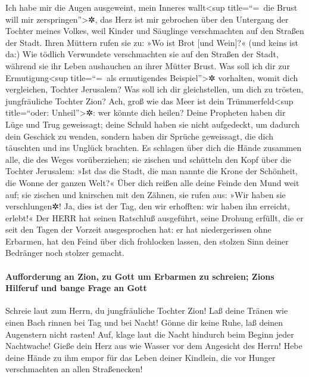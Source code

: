 Ich habe mir die Augen ausgeweint, mein Inneres
wallt\textless sup title=``=~die Brust will mir
zerspringen''\textgreater✲, das Herz ist mir gebrochen über den
Untergang der Tochter meines Volkes, weil Kinder und Säuglinge
verschmachten auf den Straßen der Stadt. Ihren Müttern
rufen sie zu: »Wo ist Brot {[}und Wein{]}?« (und keins ist da:) Wie
tödlich Verwundete verschmachten sie auf den Straßen der Stadt, während
sie ihr Leben aushauchen an ihrer Mütter Brust. Was soll
ich dir zur Ermutigung\textless sup title=``=~als ermutigendes
Beispiel''\textgreater✲ vorhalten, womit dich vergleichen, Tochter
Jerusalem? Was soll ich dir gleichstellen, um dich zu trösten,
jungfräuliche Tochter Zion? Ach, groß wie das Meer ist dein
Trümmerfeld\textless sup title=``oder: Unheil''\textgreater✲: wer könnte
dich heilen? Deine Propheten haben dir Lüge und Trug
geweissagt; deine Schuld haben sie nicht aufgedeckt, um dadurch dein
Geschick zu wenden, sondern haben dir Sprüche geweissagt, die dich
täuschten und ins Unglück brachten. Es schlagen über dich
die Hände zusammen alle, die des Weges vorüberziehen; sie zischen und
schütteln den Kopf über die Tochter Jerusalem: »Ist das die Stadt, die
man nannte die Krone der Schönheit, die Wonne der ganzen Welt?«
Über dich reißen alle deine Feinde den Mund weit auf; sie
zischen und knirschen mit den Zähnen, sie rufen aus: »Wir haben sie
verschlungen✲! Ja, dies ist der Tag, den wir erhofften: wir haben ihn
erreicht, erlebt!« Der HERR hat seinen Ratschluß
ausgeführt, seine Drohung erfüllt, die er seit den Tagen der Vorzeit
ausgesprochen hat: er hat niedergerissen ohne Erbarmen, hat den Feind
über dich frohlocken lassen, den stolzen Sinn deiner Bedränger noch
stolzer gemacht.

\hypertarget{aufforderung-an-zion-zu-gott-um-erbarmen-zu-schreien-zions-hilferuf-und-bange-frage-an-gott}{%
\paragraph{Aufforderung an Zion, zu Gott um Erbarmen zu schreien; Zions
Hilferuf und bange Frage an
Gott}\label{aufforderung-an-zion-zu-gott-um-erbarmen-zu-schreien-zions-hilferuf-und-bange-frage-an-gott}}

Schreie laut zum Herrn, du jungfräuliche Tochter Zion!
Laß deine Tränen wie einen Bach rinnen bei Tag und bei Nacht! Gönne dir
keine Ruhe, laß deinen Augenstern nicht rasten! Auf,
klage laut die Nacht hindurch beim Beginn jeder Nachtwache! Gieße dein
Herz aus wie Wasser vor dem Angesicht des Herrn! Hebe deine Hände zu ihm
empor für das Leben deiner Kindlein, die vor Hunger verschmachten an
allen Straßenecken!

